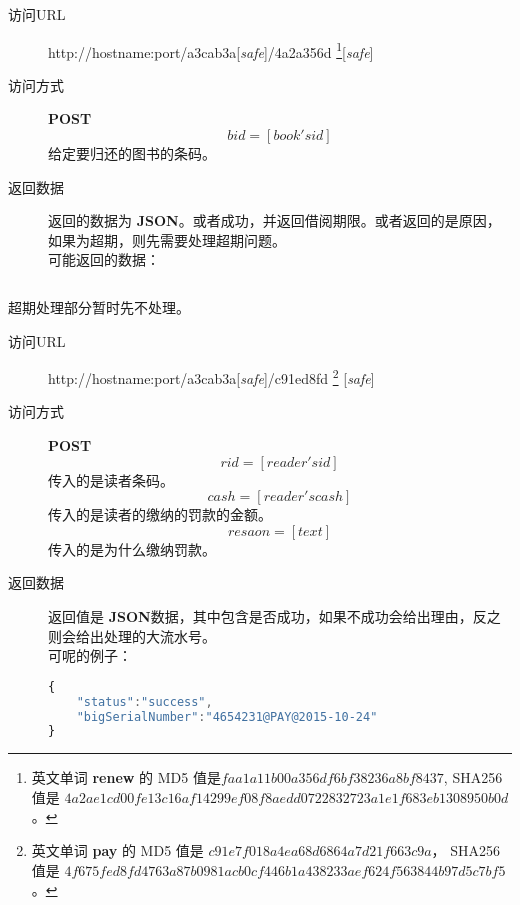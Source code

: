 \documentclass[UTF8]{article}
\def\safe{[\textit{safe}]}
\def\POST{\textbf{POST}}
\def\bfJSON{\textbf{JSON}}
\def\viaurl{\item[访问URL]}
\def\viareq#1{\item[访问方式] #1}
\def\rtdata{\item[返回数据]}
\begin{document}
        \begin{description}
	        \viaurl http://hostname:port/a3cab3a\safe/4a2a356d
		     \footnote{
		     	英文单词 \textbf{renew} 的
		     	MD5 值是$faa1a11b00a356df6bf38236a8bf8437$,
		     	SHA256 值是 $4a2ae1cd00fe13c16af14299ef08f8aedd0722832723a1e1f683eb1308950b0d$。
		     }\safe
		     \viareq{\POST}
		     $$bid=[book's id]$$
		     给定要归还的图书的条码。
		     \rtdata 返回的数据为 \bfJSON 。或者成功，并返回借阅期限。或者返回的是原因，如果为超期，则先需要处理超期问题。
		     \\ 可能返回的数据：
		     \begin{lstlisting}[]
		     \end{lstlisting}
		      \end{description}
        超期处理部分暂时先不处理。
        \begin{description}
	        \viaurl http://hostname:port/a3cab3a\safe/c91ed8fd
	        \footnote{英文单词 \textbf{pay} 的
	        	MD5 值是 $c91e7f018a4ea68d6864a7d21f663c9a$，
	        	SHA256 值是 $4f675fed8fd4763a87b0981acb0cf446b1a438233aef624f563844b97d5c7bf5$。
	        	}
	        \safe
	        \viareq{\POST}
	        $$rid=[reader's id]$$
	        传入的是读者条码。
	        $$cash=[reader's cash]$$
	        传入的是读者的缴纳的罚款的金额。
	        $$resaon=[text]$$
	        传入的是为什么缴纳罚款。
	        \rtdata 返回值是 \bfJSON 数据，其中包含是否成功，如果不成功会给出理由，反之则会给出处理的大流水号。
	        \\ 可呢的例子：
	        \begin{lstlisting}[language=JavaScript]
{
	"status":"success",
	"bigSerialNumber":"4654231@PAY@2015-10-24"
}
	        \end{lstlisting}
	    \end{description}
\end{document}
